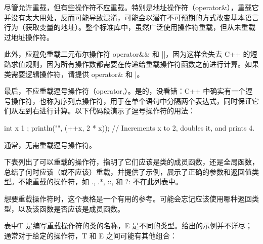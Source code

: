 
尽管允许重载，但有些操作符不应重载。特别是地址操作符（operator\&），重载它并没有太大用处，反而可能导致混淆，可能会以潜在不可预期的方式改变基本语言行为（获取变量的地址）。整个标准库中，虽然广泛使用操作符重载，但从未重载过地址操作符。

此外，应避免重载二元布尔操作符 operator\&\& 和 ||，因为这样会失去 C++ 的短路求值规则，因为所有操作数都需要在传递给重载操作符函数之前进行计算。如果类需要逻辑操作符，请提供 operator\& 和 |。

最后，不应重载逗号操作符（operator,）。是的，没看错：C++ 中确实有一个逗号操作符，也称为序列点操作符，用于在单个语句中分隔两个表达式，同时保证它们从左到右进行计算。以下代码段演示了逗号操作符的用法：

\begin{cpp}
int x { 1 };
println("{}", (++x, 2 * x)); // Increments x to 2, doubles it, and prints 4.
\end{cpp}

通常，无需重载逗号操作符。


下表列出了可以重载的操作符，指明了它们应该是类的成员函数，还是全局函数，总结了何时应该（或不应该）重载，并提供了示例，展示了正确的参数和返回值类型。不能重载的操作符，如 ., .*, ::, 和 ?: 不在此列表中。

想要重载操作符时，这个表格是一个有用的参考。可能会忘记应该使用哪种返回类型，以及该函数是否应该是成员函数。

表中T 是编写重载操作符的类的名称，E 是不同的类型。给出的示例并不详尽；通常对于给定的操作符，T 和 E 之间可能有其他组合：

